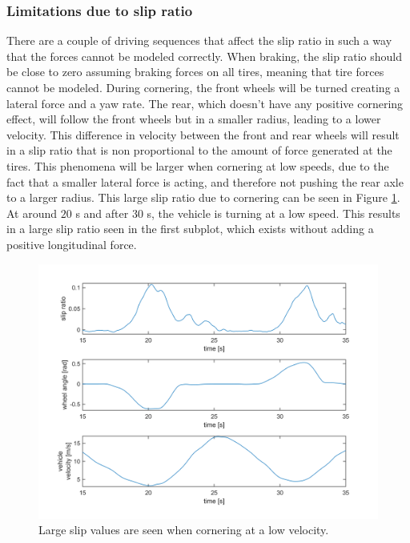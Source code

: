 \subsubsection{Limitations due to slip ratio }
There are a couple of driving sequences that affect the slip ratio in such a way that the forces cannot be modeled correctly. When braking, the slip ratio should be close to zero assuming braking forces on all tires, meaning that tire forces cannot be modeled. During cornering, the front wheels will be turned creating a lateral force and a yaw rate. The rear, which doesn't have any positive cornering effect, will follow the front wheels but in a smaller radius, leading to a lower velocity. This difference in velocity between the front and rear wheels will result in a slip ratio that is non proportional to the amount of force generated at the tires. This phenomena will be larger when cornering at low speeds, due to the fact that a smaller lateral force is acting, and therefore not pushing the rear axle to a larger radius. This large slip ratio due to cornering can be seen in Figure \ref{turning_slow_Vx}. At around $ 20 $ s and after $ 30 $ s, the vehicle is turning at a low speed. This results in a large slip ratio seen in the first subplot, which exists without adding a positive longitudinal force.

\begin{figure}[h]
	\centering
	\includegraphics[width=1.0\textwidth]{Pictures/turning_slow_Vx}
	\caption {Large slip values are seen when cornering at a low velocity.}
	\label{turning_slow_Vx}
\end{figure}

